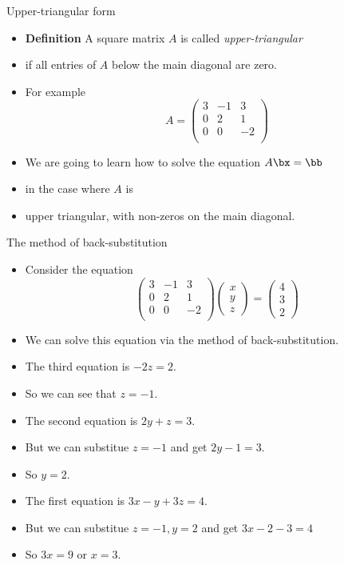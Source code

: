 \documentclass{beamer}
\begin{document}

\begin{frame}{Upper-triangular form}

\begin{itemize}
\item \textbf{Definition} A square matrix $A$ is called \emph{upper-triangular}
\item if all entries of $A$ below the main diagonal are zero.
\item For example
$$A=
\begin{pmatrix}
3 & -1  & 3 \\
0 & 2  & 1 \\
0 & 0 & -2 \\
\end{pmatrix}
$$
\item We are going to learn how to solve the equation $A\bx=\bb$
\item in the case where $A$ is
\item upper triangular, with non-zeros on the main diagonal.
\end{itemize}

\end{frame}


\begin{frame}{The method of back-substitution}

\begin{itemize}
\item Consider the equation
$$
\begin{pmatrix}
3 & -1  & 3 \\
0 & 2  & 1 \\
0 & 0 & -2 \\
\end{pmatrix}
\begin{pmatrix}
x \\ y \\ z
\end{pmatrix}
=
\begin{pmatrix}
4 \\ 3 \\ 2
\end{pmatrix}
$$
\item We can solve this equation via the method of back-substitution.
\item The third equation is $-2z=2$.
\item So we can see that $z=-1$.
\item The second equation is $2y+z = 3$.
\item But we can substitue $z=-1$ and get $2y -1 = 3$.
\item So $y=2$.
\item The first equation is $3x -y +3z = 4$.
\item But we can substitue $z=-1, y=2$ and get $3x -2  - 3 = 4$
\item So $3x = 9$ or $x=3$.
\end{itemize}

\end{frame}
\end{document}
